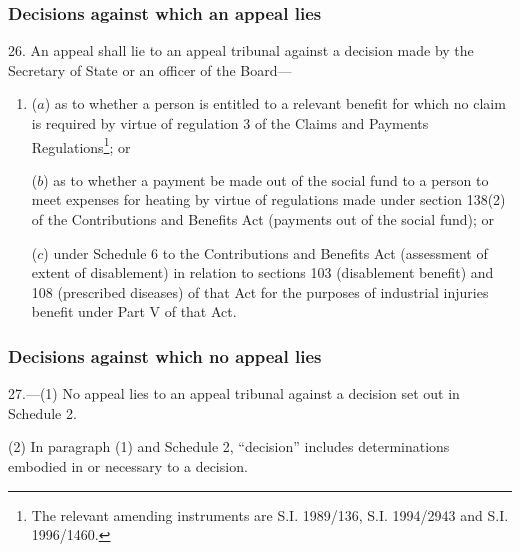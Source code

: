 \documentclass[12pt,a4paper]{article}
\begin{document}

\subsubsection[26. Decisions against which an appeal lies]{Decisions against which an appeal lies}

26.  An appeal shall lie to an appeal tribunal against a decision made by the Secretary of State
or an officer of the Board—  %
\begin{enumerate}\item[]
($a$) as to whether a person is entitled to a relevant benefit for which no claim is required by virtue of regulation 3 of the Claims and Payments Regulations\footnote{\frenchspacing The relevant amending instruments are S.I. 1989/136, S.I. 1994/2943 and S.I. 1996/1460.}; or

($b$) as to whether a payment be made out of the social fund to a person to meet expenses for heating by virtue of regulations made under section 138(2) of the Contributions and Benefits Act (payments out of the social fund);
or

($c$) under Schedule 6 to the Contributions and Benefits Act (assessment of extent of disablement) in relation to sections 103 (disablement benefit) and 108 (prescribed diseases) of that Act for the purposes of industrial injuries benefit under Part V of that Act.
\end{enumerate}


\subsubsection[27. Decisions against which no appeal lies]{Decisions against which no appeal lies}

27.—(1) No appeal lies to an appeal tribunal against a decision set out in Schedule 2.

(2) In paragraph (1) and Schedule 2, “decision” includes determinations embodied in or necessary to a decision.
\end{document}
